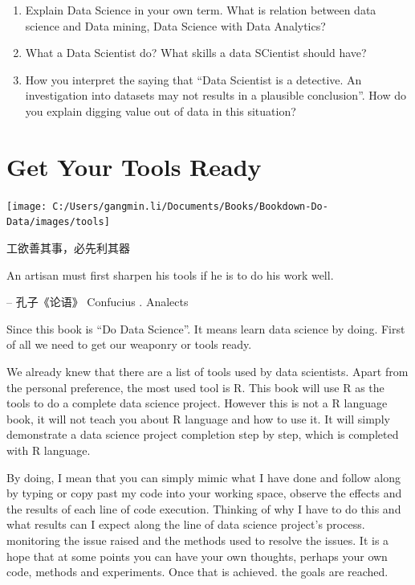 \documentclass[
]{book}
\providecommand{\tightlist}{%
  \setlength{\itemsep}{0pt}\setlength{\parskip}{0pt}}
\begin{document}
\begin{enumerate}
\def\labelenumi{\arabic{enumi}.}
\tightlist
\item
  Explain Data Science in your own term. What is relation between data science and Data mining, Data Science with Data Analytics?
\item
  What a Data Scientist do? What skills a data SCientist should have?
\item
  How you interpret the saying that ``Data Scientist is a detective. An investigation into datasets may not results in a plausible conclusion''. How do you explain digging value out of data in this situation?
\end{enumerate}

\hypertarget{tools}{%
\chapter{Get Your Tools Ready}\label{tools}}

\begin{center}\texttt{[image: C:/Users/gangmin.li/Documents/Books/Bookdown-Do-Data/images/tools]} \end{center}

工欲善其事，必先利其器

An artisan must first sharpen his tools if he is to do his work well.

-- 孔子《论语》
Confucius . Analects

Since this book is ``Do Data Science''. It means learn data science by doing. First of all we need to get our weaponry or tools ready.

We already knew that there are a list of tools used by data scientists. Apart from the personal preference, the most used tool is R. This book will use R as the tools to do a complete data science project. However this is not a R language book, it will not teach you about R language and how to use it. It will simply demonstrate a data science project completion step by step, which is completed with R language.

By doing, I mean that you can simply mimic what I have done and follow along by typing or copy past my code into your working space, observe the effects and the results of each line of code execution. Thinking of why I have to do this and what results can I expect along the line of data science project's process. monitoring the issue raised and the methods used to resolve the issues. It is a hope that at some points you can have your own thoughts, perhaps your own code, methods and experiments. Once that is achieved. the goals are reached.
\end{document}
